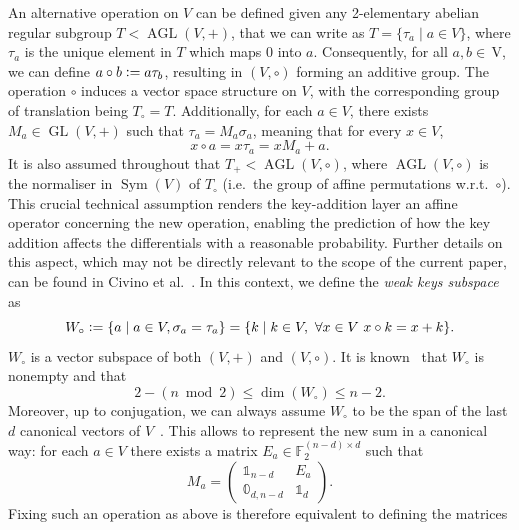 \documentclass[runningheads,a4paper,english]{llncs}
\newcommand{\F}{\mathbb{F}}
\newcommand{\sg}{\sigma}
\DeclareMathOperator{\GL}{GL}
\DeclareMathOperator{\AGL}{AGL}
\DeclareMathOperator{\sym}{Sym}
\newcommand{\defeq}{\vcentcolon=}
\newcommand{\ind}[1]{\mathds{1}_{#1}}
\begin{document}
An alternative operation on $V$ can be defined given any 2-elementary abelian regular subgroup $T < \AGL(V, +)$, that we can write as $T = \{ \tau_a \mid a \in V \}$, where $\tau_a$ is the unique element in $T$ which maps $0$ into $a$. Consequently, for all $a, b \in \, $V, we can define $a \circ b \defeq a \tau_b$, resulting in $(V, \circ)$ forming an additive group. The operation $\circ$ induces a vector space structure on $V$, with the corresponding group of translation being $T_\circ = T$. Additionally, for each $a \in V$, there exists $M_a \in \GL(V,+)$ such that $\tau_a = M_a \sg_a$, meaning that for every $x \in V$, \[x \circ a = x \tau_a = x M_a + a.\] It is also assumed throughout that $T_+ < \AGL(V,\circ)$, where $\AGL(V,\circ)$ is the normaliser in $\sym(V)$ of $T_\circ$ (i.e.\ the group of affine permutations w.r.t.\ $\circ$). This crucial technical assumption renders the key-addition layer an affine operator concerning the new operation, enabling the prediction of how the key addition affects the differentials with a reasonable probability. Further details on this aspect, which may not be directly relevant to the scope of the current paper,  can be found in Civino et al.~\cite{civino2019differential}. 
    In this context, we define the \emph{weak keys subspace} as 
    $$W_\circ \defeq \{a \mid a \in V, \sg_a = \tau_a \} = \{ k \mid k \in V, \ \forall x \in V \ x \circ k = x + k \}.$$
$W_\circ$ is a vector subspace of both $(V, +)$ and $(V, \circ)$. 
It is known~\cite{caranti2005abelian,calderini2021properties} that $W_\circ$ is nonempty and that
\begin{equation}\label{eq:bound}
2 - (n \bmod 2) \leq \dim(W_\circ) \leq n-2.
\end{equation}
Moreover, up to conjugation, we can always assume $W_\circ$ to be the span of the last $d$ canonical vectors of $V$~\cite{calderini2021properties}. This allows to represent the new sum in a canonical way: for each $a \in V$ there exists a matrix $E_a \in \F_2^{(n-d) \times d}$ such that
    \begin{equation}\label{eq:form}
    M_a = 
    \begin{pmatrix}
    \ind{n-d} & E_a \\
    \mathbb{0}_{d, n-d} & \ind{d}
    \end{pmatrix}.
    \end{equation}
Fixing such an operation as above is therefore equivalent to defining the matrices
\end{document}
